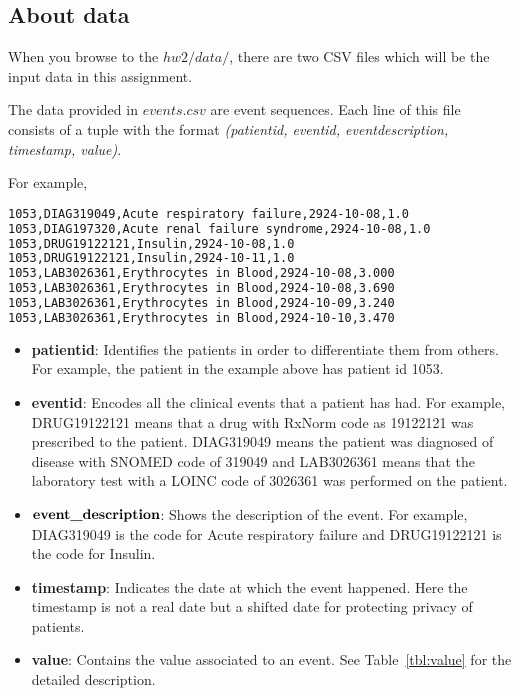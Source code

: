 \documentclass[12pt]{article}
\begin{document}
\subsection*{About data}
When you browse to the $hw2/data/$, there are two CSV files which will be the input data in this assignment. 

The data provided in \textit{$events.csv$} are event sequences. Each line of this file consists of a tuple with the format \textit{(patient\textunderscore id, event\textunderscore id, event\textunderscore description, timestamp, value)}. 

For example, 

\begin{lstlisting}[frame=single, language=bash]
1053,DIAG319049,Acute respiratory failure,2924-10-08,1.0
1053,DIAG197320,Acute renal failure syndrome,2924-10-08,1.0
1053,DRUG19122121,Insulin,2924-10-08,1.0
1053,DRUG19122121,Insulin,2924-10-11,1.0
1053,LAB3026361,Erythrocytes in Blood,2924-10-08,3.000
1053,LAB3026361,Erythrocytes in Blood,2924-10-08,3.690
1053,LAB3026361,Erythrocytes in Blood,2924-10-09,3.240
1053,LAB3026361,Erythrocytes in Blood,2924-10-10,3.470
\end{lstlisting}

\begin{itemize}
\item \textbf{patient\textunderscore id}: Identifies the patients in order to differentiate them from others. For example, the patient in the example above has patient id 1053. 
\item \textbf{event\textunderscore id}: Encodes all the clinical events that a patient has had. For example, DRUG19122121 means that a drug with RxNorm code as 19122121 was prescribed to the patient. DIAG319049 means the patient was diagnosed of disease with SNOMED code of 319049 and LAB3026361 means that the laboratory test with a LOINC code of 3026361 was performed on the patient.
\item $\textbf{event\textunderscore description}$: Shows the description of the event. For example, DIAG319049 is the code for Acute respiratory failure and DRUG19122121 is the code for Insulin. 
\item \textbf{timestamp}: Indicates the date at which the event happened. Here the timestamp is not a real date but a shifted date for protecting privacy of patients.
\item \textbf{value}: Contains the value associated to an event. See Table~\ref{tbl:value} for the detailed description.
\end{itemize}
\end{document}
